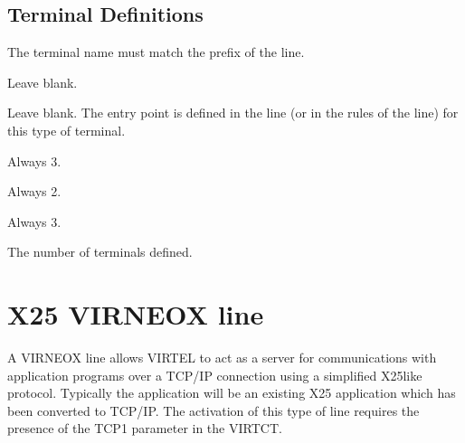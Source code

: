 \documentclass[letterpaper,10pt,english]{sphinxmanual}
\begin{document}
\subsection{Terminal Definitions}
\label{\detokenize{connectivity_guide:index-57}}\label{\detokenize{connectivity_guide:id25}}\begin{description}
\sphinxAtStartPar
The terminal name must match the prefix of the line.

\sphinxAtStartPar
Leave blank.

\sphinxAtStartPar
Leave blank. The entry point is defined in the line (or in the rules
of the line) for this type of terminal.

\sphinxAtStartPar
Always 3.

\sphinxAtStartPar
Always 2.

\sphinxAtStartPar
Always 3.

\sphinxAtStartPar
The number of terminals defined.

\end{description}

\newpage

\ignorespaces 

\section{X25 VIRNEOX line}
\label{\detokenize{connectivity_guide:x25-virneox-line}}\label{\detokenize{connectivity_guide:index-58}}
\sphinxAtStartPar
A VIRNEOX line allows VIRTEL to act as a server for communications with application programs over a TCP/IP connection using a simplified X25\sphinxhyphen{}like protocol. Typically the application will be an  existing X25 application which has been converted to TCP/IP. The activation of this type of line requires the presence of the TCP1 parameter in the VIRTCT.

\sphinxAtStartPar
{}

\ignorespaces 
\end{document}
